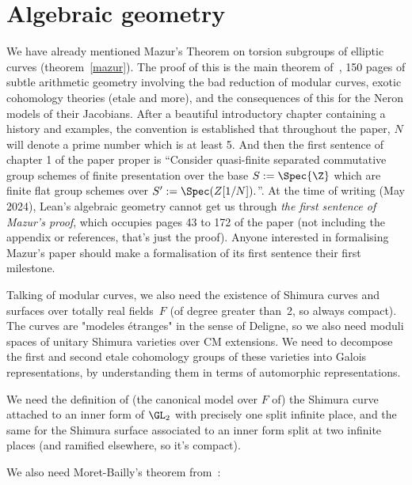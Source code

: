 \section{Algebraic geometry}

We have already mentioned Mazur's Theorem on torsion subgroups of elliptic curves (theorem~\ref{mazur}).
The proof of this is the main theorem of~\cite{mazur-torsion}, 150 pages of subtle arithmetic
geometry involving the bad reduction of modular curves, exotic cohomology theories (etale and more),
and the consequences of this for the Neron models of their Jacobians. After a beautiful
introductory chapter containing a history and examples, the convention is established that
throughout the paper, $N$ will denote a prime number which is at least 5. And then the first
sentence of chapter 1 of the paper proper is ``Consider quasi-finite separated commutative group
schemes of finite presentation over the base $S:=\Spec{\Z}$ which are finite flat group schemes
over $S':=\Spec(Z[1/N]).$''. At the time of writing (May 2024), Lean's algebraic geometry cannot
get us through \emph{the first sentence of Mazur's proof}, which occupies pages 43 to 172 of
the paper (not including the appendix or references, that's just the proof). Anyone interested
in formalising Mazur's paper should make a formalisation of its first sentence their first
milestone.

Talking of modular curves, we also need the existence of Shimura curves and surfaces over totally real fields~$F$ (of degree greater than~2, so always compact). The curves are "modeles \'etranges" in the sense of Deligne, so we also need moduli spaces of unitary Shimura varieties over CM extensions. We need to decompose the first and second etale cohomology groups of these varieties into Galois representations, by understanding them
in terms of automorphic representations.

\begin{definition}\label{Shimura_varieties}\notready We need the definition of (the canonical model over $F$ of) the Shimura curve attached to an inner form of $\GL_2$ with precisely one split infinite place, and the same for the Shimura surface associated to an inner form split at two infinite places (and ramified elsewhere, so it's compact).
\end{definition}

We also need Moret-Bailly's theorem from~\cite{moret-bailly}:

